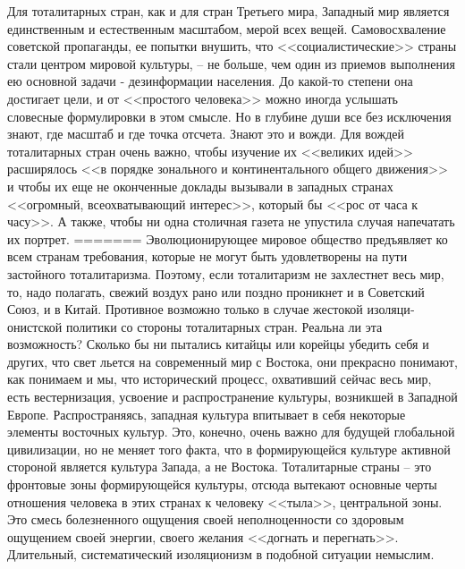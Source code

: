 \documentclass{book}
\begin{document}
{Для тоталитарных стран, как и для стран Третьего мира, Западный мир является единственным и естественным масшта­бом, мерой всех вещей. Самовосхваление советской пропаган­ды, ее попытки внушить, что <<социалистические>> страны ста­ли центром мировой культуры, -- не больше, чем один из при­емов выполнения ею основной задачи ‑ дезинформации насе­ления. До какой‑то степени она достигает цели, и от <<простого человека>> можно иногда услышать словесные формулировки в этом смысле. Но в глубине души все без исключения знают, где масштаб и где точка отсчета. Знают это и вожди. Для вож­дей тоталитарных стран очень важно, чтобы изучение их <<вели­ких идей>> расширялось <<в порядке зонального и континенталь­ного общего движения>> и чтобы их еще не оконченные докла­ды вызывали в западных странах <<огромный, всеохватываю­щий интерес>>, который бы <<рос от часа к часу>>. А также, чтобы ни одна столичная газета не упустила случая напечатать их порт­рет.
=======
Эволюционирующее мировое общество предъявляет ко всем странам требования, которые не могут быть удовлетво­рены на пути застойного тоталитаризма. Поэтому, если тотали­таризм не захлестнет весь мир, то, надо полагать, свежий воз­дух рано или поздно проникнет и в Советский Союз, и в Ки­тай. Противное возможно только в случае жестокой изоляци­онистской политики со стороны тоталитарных стран. Реальна ли эта возможность? Сколько бы ни пытались китайцы или ко­рейцы убедить себя и других, что свет льется на современный мир с Востока, они прекрасно понимают, как понимаем и мы, что исторический процесс, охвативший сейчас весь мир, есть вестернизация,  усвоение и распространение культуры, возник­шей в Западной Европе. Распространяясь, западная культура впитывает в себя некоторые элементы восточных культур. Это, конечно, очень важно для будущей глобальной цивили­зации, но не меняет того факта, что в формирующейся культу­ре активной стороной является культура Запада, а не Востока. Тоталитарные страны -- это фронтовые 
зоны формирующейся культуры, отсюда вытекают основные черты отношения чело­века в этих странах к человеку <<тыла>>, центральной зоны. Это смесь болезненного ощущения своей неполноценности со здо­ровым ощущением своей энергии, своего желания <<догнать и перегнать>>. Длительный, систематический изоляционизм в по­добной ситуации немыслим.

}
\end{document}
